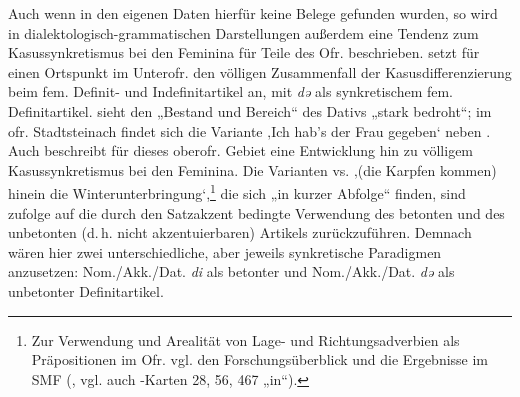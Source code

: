Auch wenn in den eigenen Daten hierfür keine Belege gefunden wurden, so wird in dialektologisch-grammatischen Darstellungen außerdem eine Tendenz zum Kasussynkretismus bei den Feminina für Teile des Ofr. beschrieben. \citet[Karte 6]{Shrier1965} setzt für einen Ortspunkt im Unterofr. den völligen Zusammenfall der Kasusdifferenzierung beim fem. Definit- und Indefinitartikel an, mit \textit{də} als synkretischem fem. Definitartikel. \citet[§6d]{Schübel1955} sieht den „Bestand und Bereich“ des Dativs „stark bedroht“; im ofr. Stadtsteinach findet sich die Variante       ‚Ich hab’s der Frau gegeben‘ neben     . Auch \citet[92]{Rowley1997} beschreibt für dieses oberofr. Gebiet eine Entwicklung hin zu völligem Kasussynkretismus bei den Feminina. Die Varianten    vs.    ‚(die Karpfen kommen) hinein die Winterunterbringung‘,\footnote{Zur Verwendung und Arealität von Lage- und Richtungsadverbien als Präpositionen im Ofr. vgl. den Forschungsüberblick und die Ergebnisse im SMF (\citealt[434--438]{SMF7}, vgl. auch \citealt{WA}-Karten 28, 56, 467 „in“).}  die sich „in kurzer Abfolge“ finden, sind \citet[92]{Rowley1997} zufolge auf die durch den Satzakzent bedingte Verwendung des betonten und des unbetonten (d.\,h. nicht akzentuierbaren) Artikels zurückzuführen. Demnach wären hier zwei unterschiedliche, aber jeweils synkretische Paradigmen anzusetzen: Nom./Akk./Dat. \textit{di} als betonter und Nom.\slash Akk./Dat. \textit{də} als unbetonter Definitartikel.

